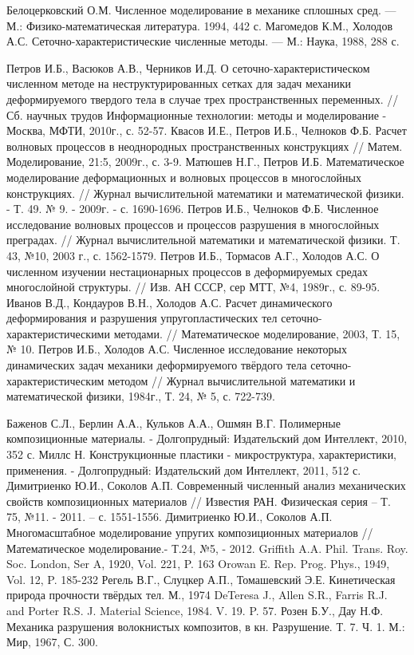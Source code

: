 \begin{thebibliography}{99}
Белоцерковский О.М. Численное моделирование в механике
сплошных сред. — М.: Физико-математическая литература. 1994, 442 с.
Магомедов К.М., Холодов А.С. Сеточно-характеристические
численные методы. — М.: Наука, 1988, 288 с.

Петров И.Б., Васюков А.В., Черников И.Д. О сеточно-характеристическом численном методе на неструктурированных сетках для задач механики деформируемого твердого тела в случае трех пространственных переменных. // Сб. научных трудов Информационные технологии: методы и моделирование - Москва, МФТИ, 2010г., с. 52-57.
Квасов И.Е., Петров И.Б., Челноков Ф.Б. Расчет волновых процессов в неоднородных пространственных конструкциях // Матем. Моделирование, 21:5, 2009г., с. 3-9.
Матюшев Н.Г., Петров И.Б. Математическое моделирование деформационных и волновых процессов в многослойных конструкциях. // Журнал вычислительной математики и математической физики. - Т. 49. № 9. - 2009г. - с. 1690-1696.
Петров И.Б., Челноков Ф.Б. Численное исследование волновых процессов и процессов разрушения в многослойных преградах. // Журнал вычислительной математики и математической физики. Т. 43, №10, 2003 г., с. 1562-1579.
Петров И.Б., Тормасов А.Г., Холодов А.С. О численном изучении нестационарных процессов в деформируемых средах многослойной структуры. // Изв. АН СССР, сер МТТ, №4, 1989г., с. 89-95. 
Иванов В.Д., Кондауров В.Н., Холодов А.С. Расчет динамического деформирования и разрушения упругопластических тел сеточно-характеристическими методами. // Математическое моделирование, 2003, Т. 15, № 10.
Петров И.Б., Холодов А.С. Численное исследование некоторых динамических задач механики деформируемого твёрдого тела сеточно-характеристическим методом // Журнал вычислительной математики и математической физики, 1984г., Т. 24, № 5, с. 722-739.

Баженов С.Л., Берлин А.А., Кульков А.А., Ошмян В.Г. Полимерные композиционные материалы. - Долгопрудный: Издательский дом Интеллект, 2010, 352 с.
Миллс Н. Конструкционные пластики - микроструктура, характеристики, применения. - Долгопрудный: Издательский дом Интеллект, 2011, 512 с.
Димитриенко Ю.И., Соколов А.П. Современный численный анализ механических свойств композиционных материалов // Известия РАН. Физическая серия – Т. 75, №11. - 2011. – с. 1551-1556. 
Димитриенко Ю.И., Соколов А.П. Многомасштабное моделирование упругих композиционных материалов // Математическое моделирование.- Т.24, №5, - 2012.
Griffith A.A. Phil. Trans. Roy. Soc. London, Ser A, 1920, Vol. 221, P. 163
 Orowan E. Rep. Prog. Phys., 1949, Vol. 12, P. 185-232
Регель В.Г., Слуцкер А.П., Томашевский Э.Е. Кинетическая природа прочности твёрдых тел. М., 1974
DeTeresa J., Allen S.R., Farris R.J. and Porter R.S. J. Material Science, 1984. V. 19. P. 57.
Розен Б.У., Дау Н.Ф. Механика разрушения волокнистых композитов, в кн. Разрушение. Т. 7. Ч. 1. М.: Мир, 1967, С. 300.


\end{thebibliography}
